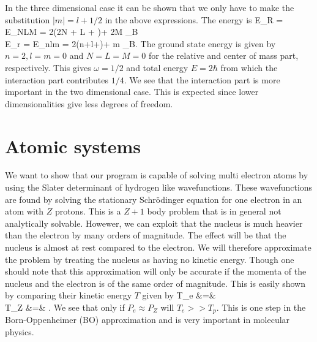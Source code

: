 In the three dimensional case it can be shown that we only have to make the substitution $|m|=l+1/2$ in the above expressions. The energy is
\bea
E_R = E_{NLM} = 2(2N + L + )\hbar\omega + 2\hbar M \omega_{B}\\
E_r = E_{nlm} =  2(n+l+)\hbar\omega +  m \hbar\omega_B.  
\eea
The ground state energy is given by $n=2,l=m=0$ and $N=L=M=0$ for the relative and center of mass part, respectively. This gives $\omega=1/2$ and total energy $E=2\hbar$ from which the interaction part contributes $1/4$. We see that the interaction part is more important in the two dimensional case. This is expected since lower dimensionalities give less degrees of freedom. 

\section{Atomic systems}
We want to show that our program is capable of solving multi electron atoms by using the Slater determinant of hydrogen like wavefunctions. These wavefunctions are found by solving the stationary Schr\"odinger equation for one electron in an atom with $Z$ protons. This is a $Z+1$ body problem that is in general not analytically solvable. Howewer, we can exploit that the nucleus is much heavier than the electron by many orders of magnitude. The effect will be that the nucleus is almost at rest compared to the electron. We will therefore approximate the problem by treating the nucleus as having no kinetic energy. Though one should note that this approximation will only be accurate if the momenta of the nucleus and the electron is of the same order of magnitude. This is easily shown by comparing their kinetic energy $T$ given by
\bea
T_e &=& \\
T_Z &=& .
\eea
We see that only if $P_e \approx P_Z$ will $T_e >> T_p$. This is one step in the Born-Oppenheimer (BO) approximation and is very important in molecular physics. 
